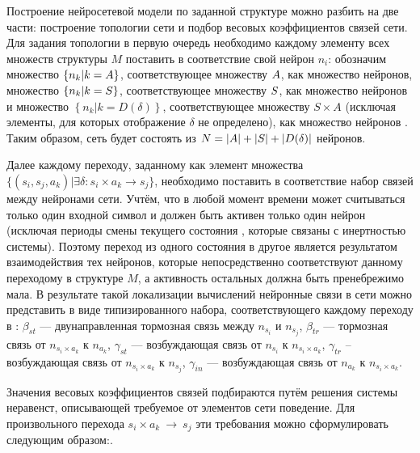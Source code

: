 Построение нейросетевой модели по заданной структуре  можно разбить на две части: построение топологии сети и подбор весовых коэффициентов связей сети. Для задания топологии в первую очередь необходимо каждому элементу всех множеств структуры $M$ поставить в соответствие свой нейрон $n_{i}$: обозначим множество $\left\{ n_{k} | k = A \right\}$, соответствующее множеству $A$, как множество  нейронов, множество $\left\{ n_{k} | k = S \right\}$, соответствующее множеству $S$, как множество нейронов  и множество $\left\{ n_{k} | k = D(\delta) \right\}$, соответствующее множеству $S\!\times\!A$ (исключая элементы, для которых отображение $\delta$ не определено), как множество нейронов . Таким образом, сеть будет состоять из $N = \left|A\right| + \left|S\right| + \left|D(\delta)\right|$ нейронов.

Далее каждому переходу, заданному как элемент множества $\{ \left( s_{i}, s_{j}, a_{k} \right) | \exists \delta\!: s_{i}\!\times\!a_{k} \to s_{j} \}$, необходимо поставить в соответствие набор связей между нейронами сети. Учтём, что в любой момент времени может считываться только один входной символ и должен быть активен только один нейрон  (исключая периоды смены текущего состояния , которые связаны с инертностью системы). Поэтому переход из одного состояния в другое является результатом взаимодействия тех нейронов, которые непосредственно соответствуют данному переходому в структуре $M$, а активность остальных должна быть пренебрежимо мала. В результате такой локализации вычислений нейронные связи в сети можно представить в виде типизированного набора, соответствующего каждому переходу в : $\beta_{st}$ --- двунаправленная тормозная связь между $n_{s_{i}}$ и $n_{s_{j}}$, $\beta_{tr}$ --- тормозная связь от $n_{s_{i}\!\times\!a_{k}}$ к $n_{a_{k}}$, $\gamma_{st}$ --- возбуждающая связь от $n_{s_{i}}$ к $n_{s_{i}\!\times\!a_{k}}$, $\gamma_{tr}$ -- возбуждающая связь от $n_{s_{i}\!\times\!a_{k}}$ к $n_{s_{j}}$, $\gamma_{in}$ --- возбуждающая связь от $n_{a_{k}}$ к $n_{s_{i}\!\times\!a_{k}}$. 

Значения весовых коэффициентов связей подбираются путём решения системы неравенст, описывающей требуемое от элементов сети поведение. Для произвольного перехода $s_{i}\!\times\!a_{k}~\to~s_{j}$ эти требования можно сформулировать следующим образом:. 

